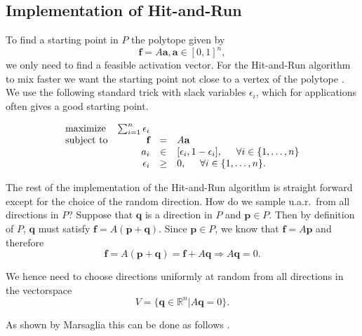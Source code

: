 \subsection{Implementation of Hit-and-Run}
To find a starting point in $P$ the polytope given by
\[\textbf{f} = A\textbf{a}, \textbf{a} \in [0,1]^n,\]
we only need to find a feasible activation vector. For the Hit-and-Run algorithm to mix faster we want the starting point not close to a vertex of the polytope \cite{Lovasz}. %
We use the following standard trick with slack variables $\epsilon_i$, which for applications often gives a good starting point.%

\begin{equation}\label{eq:LP_r}
\begin{array}{lrcl}
\mbox{maximize} & \sum_{i=1}^n \epsilon_i \\ 
\mbox{subject to} & \textbf{f} &=& A\textbf{a}\\
  & a_i &\in& [\epsilon_i, 1- \epsilon_i], \hspace{5mm} \forall i \in \{1,\dots,n\}  \\
  & \epsilon_i &\geq& 0, \hspace{5mm} \forall i \in \{1,\dots,n\}.  
\end{array}
\end{equation}


The rest of the implementation of the Hit-and-Run algorithm is straight forward except for the choice of the random direction. How do we sample u.a.r.\ from all directions in $P$? Suppose that $\textbf{q}$ is a direction in $P$ and $\textbf{p} \in P$. Then by definition of $P$, $\textbf{q}$ must satisfy $\textbf{f} = A(\textbf{p}+\textbf{q})$. Since $\textbf{p} \in P$, we know that $\textbf{f} = A\textbf{p}$ and therefore 
\[\textbf{f} = A(\textbf{p} + \textbf{q}) = \textbf{f} + A\textbf{q} \Rightarrow A\textbf{q} = 0. \]

We hence need to choose directions uniformly at random from all directions in the vectorspace 
\[V = \{\textbf{q} \in \mathbb{R}^n | A\textbf{q} = 0\}.\]

As shown by Marsaglia this can be done as follows \cite{Marsaglia}.

